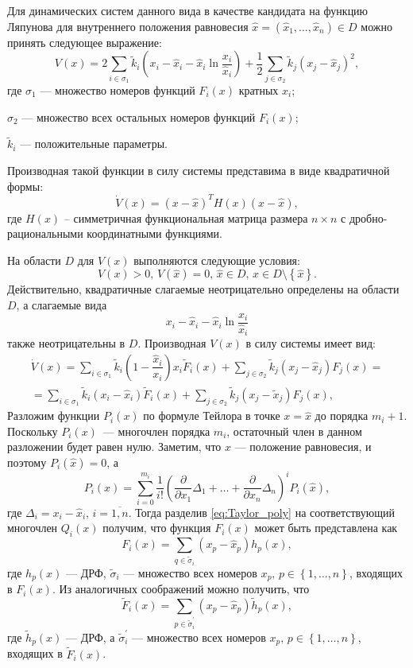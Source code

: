 \documentclass[14pt,a4paper]{extarticle}
\begin{document}
	Для динамических систем данного вида в качестве кандидата на функцию Ляпунова для внутреннего положения равновесия $\hat{x}=(\hat{x}_1,\ldots,\hat{x}_n)\in D$ можно принять следующее выражение:
	\[V(x)=2\sum\limits_{i\in\sigma_1}\tilde{k}_i\left(x_i-\hat{x}_i-\hat{x}_i\ln\dfrac{x_i}{\hat{x}_i}\right) + \dfrac{1}{2}\sum\limits_{j\in\sigma_2}\tilde{k}_j\left(x_j-\hat{x}_j\right)^2,\]
	где $\sigma_1$ --- множество номеров функций $F_i(x)$ кратных $x_i$;
	
	$\sigma_2$ --- множество всех остальных номеров функций $F_i(x)$;
	
	$\tilde{k}_i$ --- положительные параметры. 
	
	Производная такой функции в силу системы представима в виде квадратичной формы:
	\[\dot{V}(x)=(x-\hat{x})^{T}H(x)(x-\hat{x}),\]
	где $H(x)$ -- симметричная функциональная матрица размера $n\times n$ с дробно-рациональными координатными функциями. 
	
	На области $D$ для $V(x)$ выполняются следующие условия:
	\[V(x)>0,\, V(\hat{x})=0,\, \hat{x}\in D,\,x\in D\setminus\left\{\hat{x}\right\}.\]
	Действительно, квадратичные слагаемые неотрицательно определены на области $D$, а слагаемые вида
	\[x_i-\hat{x}_i-\hat{x}_i\ln\dfrac{x_i}{\hat{x}_i}\] 
	также неотрицательны в $D$. Производная $V(x)$ в силу системы имеет вид:
	\begin{multline*}
		\dot{V}(x)=\sum\limits_{i\in\sigma_1}\tilde{k}_i\left(1-\dfrac{\hat{x}_i}{x_i}\right)x_i\tilde{F}_i(x)+\sum\limits_{j\in\sigma_2}\tilde{k}_j(x_j-\hat{x}_j)F_j(x)=\\
		=\sum\limits_{i\in\sigma_1}\tilde{k}_i(x_i-\hat{x}_i)\tilde{F}_i(x)+\sum\limits_{j\in\sigma_2}\tilde{k}_j(x_j-\tilde{x}_j)F_j(x),
	\end{multline*}
	Разложим функции $P_i(x)$ по формуле Тейлора в точке $x=\hat{x}$ до порядка $m_i+1$. Поскольку $P_i(x)$~--- многочлен порядка $m_i$, остаточный член в данном разложении будет равен нулю. Заметим, что $\hat{x}$ --- положение равновесия, и поэтому $P_i(\hat{x})=0$, а
	\begin{equation}\label{eq:Taylor_poly}
		P_i(x) = \sum\limits_{i = 0}^{m_i}\dfrac{1}{i!}\left(\dfrac{\partial}{\partial{}x_1}\Delta_{1}+\ldots+\dfrac{\partial}{\partial{}x_n}\Delta_{n}\right)^{i}P_i(\hat{x}),
	\end{equation}
	где $\Delta_i=x_i-\hat{x}_i,\, i=\overline{1,n}$. Тогда разделив \ref{eq:Taylor_poly} на соответствующий многочлен $Q_i(x)$ получим, что функция $F_i(x)$ может быть представлена как
	\[F_i(x)=\sum\limits_{q\in\tilde{\sigma}_i}(x_p-\hat{x}_p)h_p(x),\]  
	где $h_p(x)$ --- ДРФ, $\tilde{\sigma}_i$ --- множество всех номеров $x_p,\, p\in\left\{1,\ldots,n\right\}$, входящих в $F_i(x)$. Из аналогичных соображений можно получить, что 
	\[
	\tilde{F}_i(x)=\sum\limits_{p\in\tilde{\sigma}^\prime_i}(x_p-\hat{x}_p)\tilde{h}_p(x),\]
	где $\tilde{h}_p(x)$ --- ДРФ, а $\tilde{\sigma}^\prime_i$ --- множество всех номеров $x_p,\, p\in\left\{1,\ldots,n\right\}$, входящих в $\tilde{F}_i(x)$.
	
\end{document}
